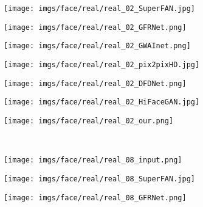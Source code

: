\documentclass[final]{cvpr}
\begin{document}
\begin{figure*}[t!]
\begin{subfigure}[t!]{.12\textwidth}
    \end{subfigure}
    \begin{subfigure}[t!]{.12\textwidth}
        \texttt{[image: imgs/face/real/real\_02\_SuperFAN.jpg]}
    \end{subfigure}
    \begin{subfigure}[t!]{.12\textwidth}
        \texttt{[image: imgs/face/real/real\_02\_GFRNet.png]}
    \end{subfigure}
    \begin{subfigure}[t!]{.12\textwidth}
        \texttt{[image: imgs/face/real/real\_02\_GWAInet.png]}
    \end{subfigure}
    \begin{subfigure}[t!]{.12\textwidth}
        \texttt{[image: imgs/face/real/real\_02\_pix2pixHD.jpg]}
    \end{subfigure}
    \begin{subfigure}[t!]{.12\textwidth}
        \texttt{[image: imgs/face/real/real\_02\_DFDNet.png]}
    \end{subfigure}
    \begin{subfigure}[t!]{.12\textwidth}
        \texttt{[image: imgs/face/real/real\_02\_HiFaceGAN.jpg]}
    \end{subfigure}
    \begin{subfigure}[t!]{.12\textwidth}
        \texttt{[image: imgs/face/real/real\_02\_our.png]}
    \end{subfigure}
    \\
    \begin{subfigure}[t!]{.12\textwidth}
        \texttt{[image: imgs/face/real/real\_08\_input.png]}
        \vspace*{-5mm}
        \caption{}
    \end{subfigure}
    \begin{subfigure}[t!]{.12\textwidth}
        \texttt{[image: imgs/face/real/real\_08\_SuperFAN.jpg]}
        \vspace*{-5mm}
        \caption{}
    \end{subfigure}
    \begin{subfigure}[t!]{.12\textwidth}
        \texttt{[image: imgs/face/real/real\_08\_GFRNet.png]}
        \vspace*{-5mm}
        \caption{}
    \end{subfigure}
    \begin{subfigure}[t!]{.12\textwidth}

\end{subfigure}
\end{figure*}
\end{document}
